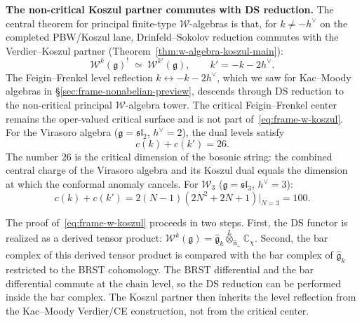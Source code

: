 \medskip
\noindent\textbf{The non-critical Koszul partner commutes with DS reduction.}
The central theorem for principal finite-type $\mathcal{W}$-algebras is
that, for $k\neq -h^\vee$ on the completed PBW/Koszul lane,
Drinfeld--Sokolov reduction commutes with the Verdier--Koszul partner
(Theorem~\ref{thm:w-algebra-koszul-main}):
\begin{equation}\label{eq:frame-w-koszul}
\mathcal{W}^k(\mathfrak{g})^!
\;\simeq\;
\mathcal{W}^{k'}(\mathfrak{g}),
\qquad
k' = -k - 2h^\vee.
\end{equation}
The Feigin--Frenkel level reflection $k \leftrightarrow -k - 2h^\vee$,
which we saw for Kac--Moody algebras in
\S\ref{sec:frame-nonabelian-preview}, descends through DS reduction
to the non-critical principal $\mathcal{W}$-algebra tower. The
critical Feigin--Frenkel center remains the oper-valued critical
surface and is not part of~\eqref{eq:frame-w-koszul}. For the
Virasoro algebra
($\mathfrak{g} = \mathfrak{sl}_2$, $h^\vee = 2$), the dual levels
satisfy
\begin{equation}\label{eq:frame-virasoro-dual-central-charge}
c(k) + c(k') = 26.
\end{equation}
The number $26$ is the critical dimension of the bosonic string:
the combined central charge of the Virasoro algebra and its Koszul
dual equals the dimension at which the conformal anomaly cancels.
For $\mathcal{W}_3$ ($\mathfrak{g} = \mathfrak{sl}_3$,
$h^\vee = 3$):
\begin{equation}\label{eq:frame-w3-dual-central-charge}
c(k) + c(k') = 2(N{-}1)(2N^2{+}2N{+}1)\big|_{N=3} = 100.
\end{equation}

The proof of~\eqref{eq:frame-w-koszul} proceeds in two steps.
First, the DS functor is realized as a derived tensor product:
$\mathcal{W}^k(\mathfrak{g}) = \widehat{\mathfrak{g}}_k
\overset{L}{\otimes}_{\widehat{\mathfrak{n}}_+} \mathbb{C}_\chi$.
Second, the bar complex of this derived tensor product is compared
with the bar complex of $\widehat{\mathfrak{g}}_k$ restricted to
the BRST cohomology. The BRST differential and the
bar differential commute at the chain level, so the DS reduction
can be performed inside the bar complex. The Koszul partner then
inherits the level reflection from the Kac--Moody Verdier/CE
construction, not from the critical center.

